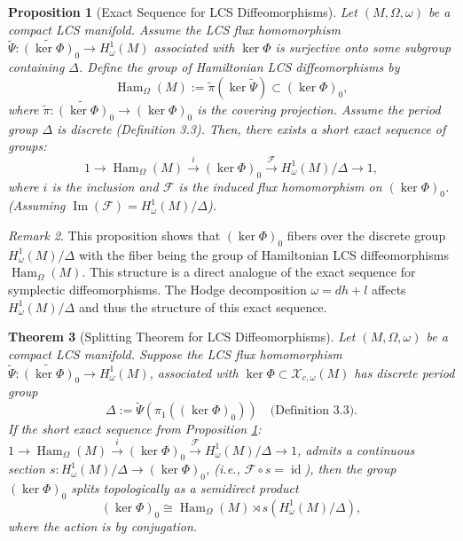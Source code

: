 \documentclass[11pt,a4paper]{amsart}
\newtheorem{theorem}{Theorem}[section]
\newtheorem{proposition}[theorem]{Proposition}
\theoremstyle{definition}
\theoremstyle{remark}
\newtheorem{remark}[theorem]{Remark}
\newcommand{\Ham}{\operatorname{Ham}}
\newcommand{\ImMap}{\operatorname{Im}}
\newcommand{\id}{\operatorname{id}}
\begin{document}
	\begin{proposition}[Exact Sequence for LCS Diffeomorphisms] \label{prop:exact_sequence}
		Let $(M, \Omega, \omega)$ be a compact LCS manifold. Assume the LCS flux homomorphism $\widetilde{\Psi} : \widetilde{(\ker \Phi)}_0 \to H_\omega^1(M)$ associated with $\ker \Phi$ is surjective onto some subgroup containing $\Delta$. Define the group of Hamiltonian LCS diffeomorphisms by
		\[
		\Ham_\Omega(M) := \tilde{\pi}(\ker \widetilde{\Psi}) \subset (\ker \Phi)_0,
		\]
		where $\tilde{\pi} : \widetilde{(\ker \Phi)}_0 \to (\ker \Phi)_0$ is the covering projection. Assume the period group $\Delta$ is discrete (Definition 3.3). Then, there exists a short exact sequence of groups:
		\[
		1 \longrightarrow \Ham_\Omega(M) \xrightarrow{i} (\ker \Phi)_0 \xrightarrow{\mathcal{F}} H_\omega^1(M)/\Delta \longrightarrow 1,
		\]
		where $i$ is the inclusion and $\mathcal{F}$ is the induced flux homomorphism on $(\ker \Phi)_0$. (Assuming $\ImMap(\mathcal{F}) = H_\omega^1(M)/\Delta$).
	\end{proposition}
	
	\begin{remark}
		This proposition shows that $(\ker \Phi)_0$ fibers over the discrete group $H_\omega^1(M)/\Delta$ with the fiber being the group of Hamiltonian LCS diffeomorphisms $\Ham_\Omega(M)$. This structure is a direct analogue of the exact sequence for symplectic diffeomorphisms. The Hodge decomposition $\omega = dh + l$ affects $H_\omega^1(M)/\Delta$ and thus the structure of this exact sequence.
	\end{remark}
	
	\begin{theorem}[Splitting Theorem for LCS Diffeomorphisms] \label{thm:splitting}
		Let $(M, \Omega, \omega)$ be a compact LCS manifold. Suppose the LCS flux homomorphism $\widetilde{\Psi} : \widetilde{(\ker \Phi)}_0 \to H_\omega^1(M)$, associated with $\ker \Phi \subset \mathcal{X}_{c,\omega}(M)$ has discrete period group
		\[
		\Delta := \widetilde{\Psi}\left(\pi_1((\ker \Phi)_0)\right) \quad \text{(Definition 3.3)}.
		\]
		If the short exact sequence from Proposition \ref{prop:exact_sequence}: $1 \longrightarrow \Ham_\Omega(M) \xrightarrow{i} (\ker \Phi)_0 \xrightarrow{\mathcal{F}} H_\omega^1(M)/\Delta \longrightarrow 1$, admits a continuous section $s : H_\omega^1(M)/\Delta \to (\ker \Phi)_0$, (i.e., $\mathcal{F} \circ s = \id$), then the group $(\ker \Phi)_0$ splits topologically as a semidirect product
		\[
		(\ker \Phi)_0 \cong \Ham_\Omega(M) \rtimes s(H_\omega^1(M)/\Delta),
		\]
		where the action is by conjugation.
	\end{theorem}
	
\end{document}

